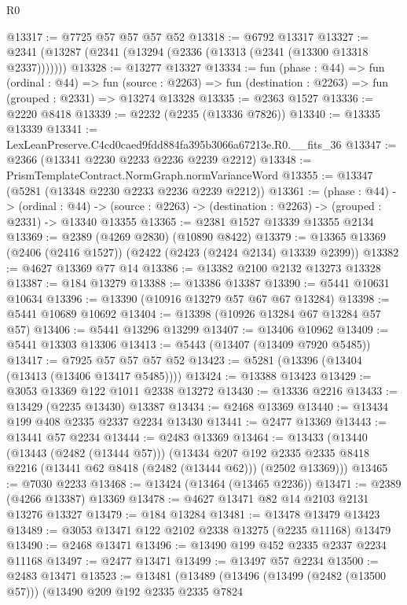 \begin{lexlean}{R0}
\begin{coremodule}
@13317 := @7725 @57 @57 @57 @52
@13318 := @6792 @13317
@13327 := @2341 (@13287 (@2341 (@13294 (@2336 (@13313 (@2341 (@13300 @13318 @2337)))))))
@13328 := @13277 @13327
@13334 := fun (phase : @44) =>
  fun (ordinal : @44) =>
  fun (source : @2263) => fun (destination : @2263) => fun (grouped : @2331) => @13274 @13328
@13335 := @2363 @1527
@13336 := @2220 @8418
@13339 := @2232 (@2235 (@13336 @7826))
@13340 := @13335 @13339
@13341 := LexLeanPreserve.C4cd0caed9fdd884fa395b3066a67213e.R0.__fits_36
@13347 := @2366 (@13341 @2230 @2233 @2236 @2239 @2212)
@13348 := PrismTemplateContract.NormGraph.normVarianceWord
@13355 := @13347 (@5281 (@13348 @2230 @2233 @2236 @2239 @2212))
@13361 := (phase : @44) ->
  (ordinal : @44) -> (source : @2263) -> (destination : @2263) -> (grouped : @2331) -> @13340 @13355
@13365 := @2381 @1527 @13339 @13355 @2134
@13369 := @2389 (@4269 @2830) (@10890 @8422)
@13379 := @13365 @13369 (@2406 (@2416 @1527)) (@2422 (@2423 (@2424 @2134) @13339 @2399))
@13382 := @4627 @13369 @77 @14
@13386 := @13382 @2100 @2132 @13273 @13328
@13387 := @184 @13279
@13388 := @13386 @13387
@13390 := @5441 @10631 @10634
@13396 := @13390 (@10916 @13279 @57 @67 @67 @13284)
@13398 := @5441 @10689 @10692
@13404 := @13398 (@10926 @13284 @67 @13284 @57 @57)
@13406 := @5441 @13296 @13299
@13407 := @13406 @10962
@13409 := @5441 @13303 @13306
@13413 := @5443 (@13407 (@13409 @7920 @5485))
@13417 := @7925 @57 @57 @57 @52
@13423 := @5281 (@13396 (@13404 (@13413 (@13406 @13417 @5485))))
@13424 := @13388 @13423
@13429 := @3053 @13369 @122 @1011 @2338 @13272
@13430 := @13336 @2216
@13433 := @13429 (@2235 @13430) @13387
@13434 := @2468 @13369
@13440 := @13434 @199 @408 @2335 @2337 @2234 @13430
@13441 := @2477 @13369
@13443 := @13441 @57 @2234
@13444 := @2483 @13369
@13464 := @13433
    (@13440
      (@13443 (@2482 (@13444 @57)))
      (@13434
        @207
        @192
        @2335
        @2335
        @8418
        @2216
        (@13441 @62 @8418 (@2482 (@13444 @62)))
        (@2502 @13369)))
@13465 := @7030 @2233
@13468 := @13424 (@13464 (@13465 @2236))
@13471 := @2389 (@4266 @13387) @13369
@13478 := @4627 @13471 @82 @14 @2103 @2131 @13276 @13327
@13479 := @184 @13284
@13481 := @13478 @13479 @13423
@13489 := @3053 @13471 @122 @2102 @2338 @13275 (@2235 @11168) @13479
@13490 := @2468 @13471
@13496 := @13490 @199 @452 @2335 @2337 @2234 @11168
@13497 := @2477 @13471
@13499 := @13497 @57 @2234
@13500 := @2483 @13471
@13523 := @13481
    (@13489
      (@13496
        (@13499 (@2482 (@13500 @57)))
        (@13490
          @209
          @192
          @2335
          @2335
          @7824

\end{coremodule}
\end{lexlean}
